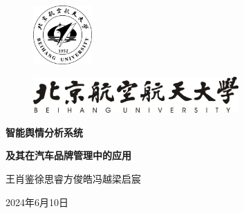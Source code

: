 \documentclass[UTF8,a4paper,15pt,titlepage,oneside]{ctexbook}
\begin{document}
\begin{titlepage}

        

        
        \begin{figure}[h]
          \begin{flushleft}
              \includegraphics[width=0.2\textwidth, keepaspectratio=false]{pictures/44.png} %
          \end{flushleft}
      \end{figure}
        
        \begin{center}

        \begin{figure}[H]
          \centering
          \includegraphics[width=0.7\textwidth,keepaspectratio=false]{pictures/43.png} %
      
        \end{figure}
        \vspace*{2cm}
        {\Huge \textbf{智能舆情分析系统}}
        \vspace{0.3cm}

        {\Huge \textbf{及其在汽车品牌管理中的应用}}
        
        \vspace{1cm}
        
        {\Large 王肖鉴\;徐思睿\;方俊皓\;冯越\;梁启宸}

        
        \vfill

        {\Large 2024年6月10日}
        
        
        
        \vspace{1cm}
        
        
        
        
        
        
        \vfill
      \end{center}
\end{titlepage}
\newpage
\end{document}
